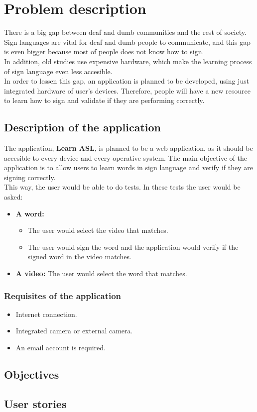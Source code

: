 \chapter{Problem description}

There is a big gap between deaf and dumb communities and the rest of society. Sign languages are vital for deaf and dumb people to communicate, and this gap is even bigger because most of people does not know how to sign. \\

In addition, old studies use expensive hardware, which make the learning process of sign language even less accesible. \\ 

In order to lessen this gap, an application is planned to be developed, using just integrated hardware of user's devices. Therefore, people will have a new resource to learn how to sign and validate if they are performing correctly.

\section{Description of the application}
The application, \textbf{Learn ASL}, is planned to be a web application, as it should be accesible to every device and every operative system.
The main objective of the application is to allow users to learn words in sign language and verify if they are signing correctly. \\

This way, the user would be able to do tests. In these tests the user would be asked:
\begin{itemize}
    \item \textbf{A word:} 
        \begin{itemize}
            \item The user would select the video that matches.
            \item The user would sign the word and the application would verify if the signed word in the video matches.
        \end{itemize}
    \item \textbf{A video:} The user would select the word that matches.
\end{itemize}

\subsection{Requisites of the application}
\begin{itemize}
    \item Internet connection.
    \item Integrated camera or external camera.
    \item An email account is required.
\end{itemize}

\section{Objectives}

\section{User stories}

